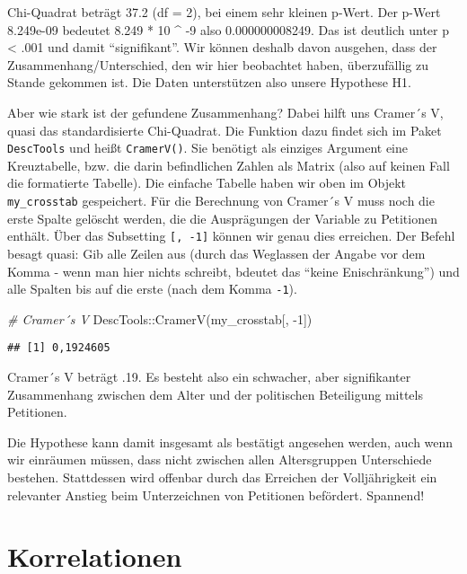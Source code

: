 \documentclass[
]{book}
\newenvironment{Shaded}{\begin{snugshade}}{\end{snugshade}}
\newcommand{\CommentTok}[1]{\textcolor[rgb]{0.56,0.35,0.01}{\textit{#1}}}
\newcommand{\DecValTok}[1]{\textcolor[rgb]{0.00,0.00,0.81}{#1}}
\newcommand{\FunctionTok}[1]{\textcolor[rgb]{0.00,0.00,0.00}{#1}}
\newcommand{\NormalTok}[1]{#1}
\newcommand{\SpecialCharTok}[1]{\textcolor[rgb]{0.00,0.00,0.00}{#1}}
\begin{document}
Chi-Quadrat beträgt 37.2 (df = 2), bei einem sehr kleinen p-Wert. Der p-Wert 8.249e-09 bedeutet 8.249 * 10 \^{} -9 also 0.000000008249. Das ist deutlich unter p \textless{} .001 und damit ``signifikant''. Wir können deshalb davon ausgehen, dass der Zusammenhang/Unterschied, den wir hier beobachtet haben, überzufällig zu Stande gekommen ist. Die Daten unterstützen also unsere Hypothese H1.

Aber wie stark ist der gefundene Zusammenhang? Dabei hilft uns Cramer´s V, quasi das standardisierte Chi-Quadrat. Die Funktion dazu findet sich im Paket \texttt{DescTools} und heißt \texttt{CramerV()}. Sie benötigt als einziges Argument eine Kreuztabelle, bzw. die darin befindlichen Zahlen als Matrix (also auf keinen Fall die formatierte Tabelle). Die einfache Tabelle haben wir oben im Objekt \texttt{my\_crosstab} gespeichert. Für die Berechnung von Cramer´s V muss noch die erste Spalte gelöscht werden, die die Ausprägungen der Variable zu Petitionen enthält. Über das Subsetting \texttt{{[},\ -1{]}} können wir genau dies erreichen. Der Befehl besagt quasi: Gib alle Zeilen aus (durch das Weglassen der Angabe vor dem Komma - wenn man hier nichts schreibt, bdeutet das ``keine Enischränkung'') und alle Spalten bis auf die erste (nach dem Komma \texttt{-1}).

\begin{Shaded}
\begin{Highlighting}[]
\CommentTok{\# Cramer´s V}
\NormalTok{DescTools}\SpecialCharTok{::}\FunctionTok{CramerV}\NormalTok{(my\_crosstab[, }\SpecialCharTok{{-}}\DecValTok{1}\NormalTok{])}
\end{Highlighting}
\end{Shaded}

\begin{verbatim}
## [1] 0,1924605
\end{verbatim}

Cramer´s V beträgt .19. Es besteht also ein schwacher, aber signifikanter Zusammenhang zwischen dem Alter und der politischen Beteiligung mittels Petitionen.

Die Hypothese kann damit insgesamt als bestätigt angesehen werden, auch wenn wir einräumen müssen, dass nicht zwischen allen Altersgruppen Unterschiede bestehen.
Stattdessen wird offenbar durch das Erreichen der Volljährigkeit ein relevanter Anstieg beim Unterzeichnen von Petitionen befördert. Spannend!

\hypertarget{korrelationen}{%
\section{Korrelationen}\label{korrelationen}}
\end{document}
